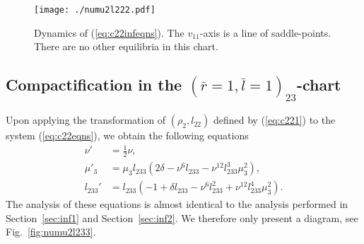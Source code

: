 \documentclass[reqno,12pt]{amsart}
\newcommand{\secref}[1]{Section~\ref{sec:#1}}
\newcommand{\eqlab}[1]{\label{eq:#1}}
\renewcommand{\eqref}[1]{(\ref{eq:#1})}
\newcommand{\figref}[1]{Fig.~\ref{fig:#1}}
\newcommand{\figlab}[1]{\label{fig:#1}}
\numberwithin{equation}{section}
\begin{document}
 
 \begin{figure}[h!]
 	\begin{center}
 		{\texttt{[image: ./numu2l222.pdf]}}
 		\caption{Dynamics of \eqref{c22infeqns}. The $v_{11}$-axis is a line of saddle-points. There are no other equilibria in this chart. }\figlab{numu2l222}
 	\end{center}
 \end{figure}
\subsection{Compactification in the $(\bar r=1,\bar l=1)_{23}$-chart}
Upon applying the transformation of $(\rho_2,l_{22})$ defined by \eqref{c221} to the system \eqref{c22eqns}, we obtain the following equations
\begin{equation}\eqlab{c23infeqns}
\begin{aligned}
 \nu' &= \frac12 \nu,\\
  \mu'_{3} &= \mu_3 l_{233}\left(2\delta-\nu^6 l_{233}-\nu^{12} l_{233}^3 \mu_3^2\right),\\
 l_{233}' &=l_{233}\left(-1+\delta l_{233}-\nu^6 l_{233}^2+\nu^{12} l_{233}^4 \mu_3^2\right).
\end{aligned}
\end{equation}
The analysis of these equations is almost identical to the analysis performed in \secref{inf1} and \secref{inf2}. We therefore only present a diagram, see \figref{numu2l233}.
\end{document}
